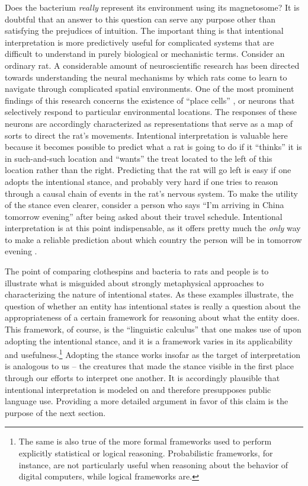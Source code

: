 Does the bacterium \textit{really} represent its environment using its magnetosome? It is doubtful that an answer to this question can serve any purpose other than satisfying the prejudices of intuition. The important thing is that intentional interpretation is more predictively useful for complicated systems that are difficult to understand in purely biological or mechanistic terms. Consider an ordinary rat. A considerable amount of neuroscientific research has been directed towards understanding the neural mechanisms by which rats come to learn to navigate through complicated spatial environments. One of the most prominent findings of this research concerns the existence of ``place cells'' \citep{McNaughton:1993}, or neurons that selectively respond to particular environmental locations. The responses of these neurons are accordingly characterized as representations that serve as a map of sorts to direct the rat's movements. Intentional interpretation is valuable here because it becomes possible to predict what a rat is going to do if it ``thinks'' it is in such-and-such location and ``wants'' the treat located to the left of this location rather than the right. Predicting that the rat will go left is easy if one adopts the intentional stance, and probably very hard if one tries to reason through a causal chain of events in the rat's nervous system. To make the utility of the stance even clearer, consider a person who says ``I'm arriving in China tomorrow evening'' after being asked about their travel schedule. Intentional interpretation is at this point indispensable, as it offers pretty much the \textit{only} way to make a reliable prediction about which country the person will be in tomorrow evening \citep{Dennett:1987}. 

The point of comparing clothespins and bacteria to rats and people is to illustrate what is misguided about strongly metaphysical approaches to characterizing the nature of intentional states. As these examples illustrate, the question of whether an entity has intentional states is really a question about the appropriateness of a certain framework for reasoning about what the entity does. This framework, of course, is the ``linguistic calculus'' that one makes use of upon adopting the intentional stance, and it is a framework varies in its applicability and usefulness.\footnote{The same is also true of the more formal frameworks used to perform explicitly statistical or logical reasoning. Probabilistic frameworks, for instance, are not particularly useful when reasoning about the behavior of digital computers, while logical frameworks are.} Adopting the stance works insofar as the target of interpretation is analogous to us -- the creatures that made the stance visible in the first place through our efforts to interpret one another. It is accordingly plausible that intentional interpretation is modeled on and therefore presupposes public language use. Providing a more detailed argument in favor of this claim is the purpose of the next section. 

